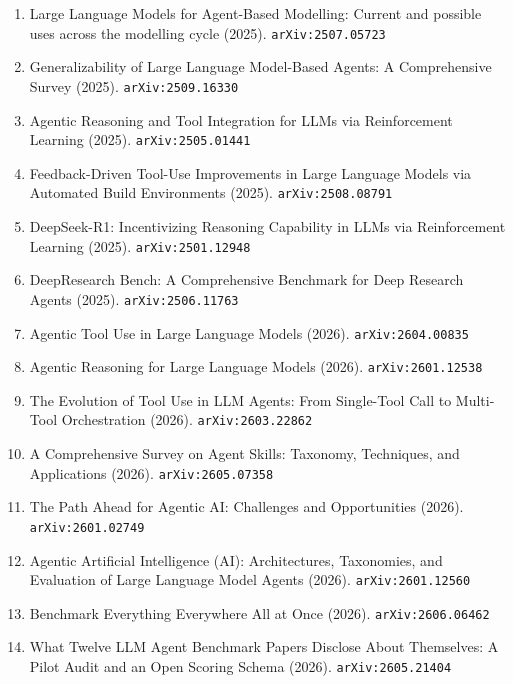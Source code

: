 \documentclass[11pt]{article}
\begin{document}
\begin{enumerate}
  \item Large Language Models for Agent-Based Modelling: Current and possible uses across the modelling cycle (2025). \texttt{arXiv:2507.05723}
  \item Generalizability of Large Language Model-Based Agents: A Comprehensive Survey (2025). \texttt{arXiv:2509.16330}
  \item Agentic Reasoning and Tool Integration for LLMs via Reinforcement
  Learning (2025). \texttt{arXiv:2505.01441}
  \item Feedback-Driven Tool-Use Improvements in Large Language Models via Automated Build Environments (2025). \texttt{arXiv:2508.08791}
  \item DeepSeek-R1: Incentivizing Reasoning Capability in LLMs via Reinforcement Learning (2025). \texttt{arXiv:2501.12948}
  \item DeepResearch Bench: A Comprehensive Benchmark for Deep Research Agents (2025). \texttt{arXiv:2506.11763}
  \item Agentic Tool Use in Large Language Models (2026). \texttt{arXiv:2604.00835}
  \item Agentic Reasoning for Large Language Models (2026). \texttt{arXiv:2601.12538}
  \item The Evolution of Tool Use in LLM Agents: From Single-Tool Call to Multi-Tool Orchestration (2026). \texttt{arXiv:2603.22862}
  \item A Comprehensive Survey on Agent Skills: Taxonomy, Techniques, and Applications (2026). \texttt{arXiv:2605.07358}
  \item The Path Ahead for Agentic AI: Challenges and Opportunities (2026). \texttt{arXiv:2601.02749}
  \item Agentic Artificial Intelligence (AI): Architectures, Taxonomies, and Evaluation of Large Language Model Agents (2026). \texttt{arXiv:2601.12560}
  \item Benchmark Everything Everywhere All at Once (2026). \texttt{arXiv:2606.06462}
  \item What Twelve LLM Agent Benchmark Papers Disclose About Themselves: A Pilot Audit and an Open Scoring Schema (2026). \texttt{arXiv:2605.21404}
\end{enumerate}
\end{document}
